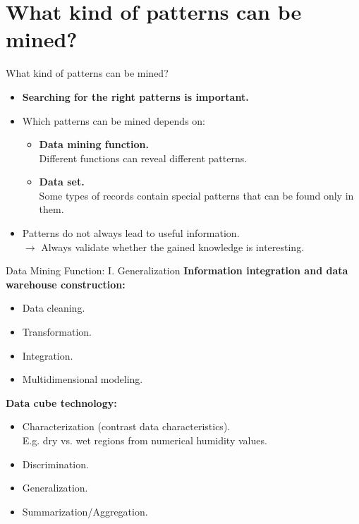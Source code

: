 \section{What kind of patterns can be mined?}

\begin{frame}{What kind of patterns can be mined?}
	\begin{itemize}
		\item \textbf{Searching for the right patterns is important.}
		\item Which patterns can be mined depends on:
		      \begin{itemize}
			      \item \textbf{Data mining function.} \\
			            \small{Different functions can reveal different patterns.}
			      \item \textbf{Data set.} \\
			            \small{Some types of records contain special patterns that
				            can be found only in them.}
		      \end{itemize}
		\item Patterns do not always lead to useful information. \\
		      $\rightarrow$ Always validate whether the gained knowledge is
		      interesting.
	\end{itemize}
\end{frame}

\begin{frame}{Data Mining Function: I. Generalization}
	\textbf{Information integration and data warehouse construction:}
	\begin{itemize}
		\item Data cleaning.
		\item Transformation.
		\item Integration.
		\item Multidimensional modeling.
	\end{itemize}
	\textbf{Data cube technology:}
	\begin{itemize}
		\item Characterization (contrast data characteristics).\\
		      E.g. dry vs. wet regions from numerical humidity values.
		\item Discrimination.
		\item Generalization.
		\item Summarization/Aggregation.
	\end{itemize}
\end{frame}

